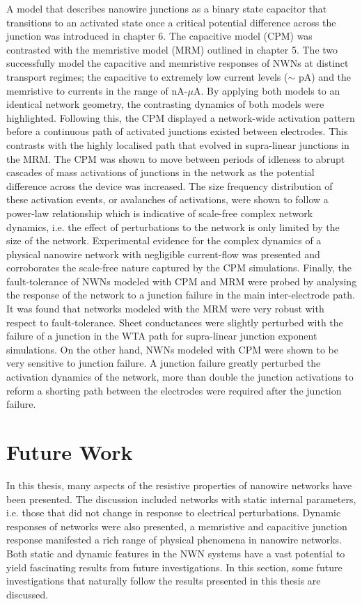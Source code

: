 A model that describes nanowire junctions as a binary state capacitor that transitions to an activated state once a critical potential difference across the junction was introduced in chapter 6. The capacitive model (CPM) was contrasted with the memristive model (MRM) outlined in chapter 5.  The two successfully model the capacitive and memristive responses of NWNs at distinct transport regimes; the capacitive to extremely low current levels ($\sim$ pA) and the memristive to currents in the range of nA-$\mu$A. By applying both models to an identical network geometry, the contrasting dynamics of both models were highlighted. Following this, the CPM displayed a network-wide activation pattern before a continuous path of activated junctions existed between electrodes. This contrasts with the highly localised path that evolved in supra-linear junctions in the MRM. The CPM was shown to move between periods of idleness to abrupt cascades of mass activations of junctions in the network as the potential difference across the device was increased. The size frequency distribution of these activation events, or avalanches of activations, were shown to follow a power-law relationship which is indicative of scale-free complex network dynamics, i.e. the effect of perturbations to the network is only limited by the size of the network. Experimental evidence for the complex dynamics of a physical nanowire network with negligible current-flow was presented and corroborates the scale-free nature captured by the CPM simulations. Finally, the fault-tolerance of NWNs modeled with CPM and MRM were probed by analysing the response of the network to a junction failure in the main inter-electrode path. It was found that networks modeled with the MRM were very robust with respect to fault-tolerance. Sheet conductances were slightly perturbed with the failure of a junction in the WTA path for supra-linear junction exponent simulations. On the other hand, NWNs modeled with CPM were shown to be very sensitive to junction failure. A junction failure greatly perturbed the activation dynamics of the network, more than double the junction activations to reform a shorting path between the electrodes were required after the junction failure. 

\section{Future Work}
In this thesis, many aspects of the resistive properties of nanowire networks have been presented. The discussion included networks with static internal parameters, i.e. those that did not change in response to electrical perturbations. Dynamic responses of networks were also presented, a memristive and capacitive junction response manifested a rich range of physical phenomena in nanowire networks. Both static and dynamic features in the NWN systems have a vast potential to yield fascinating results from future investigations. In this section, some future investigations that naturally follow the results presented in this thesis are discussed.

